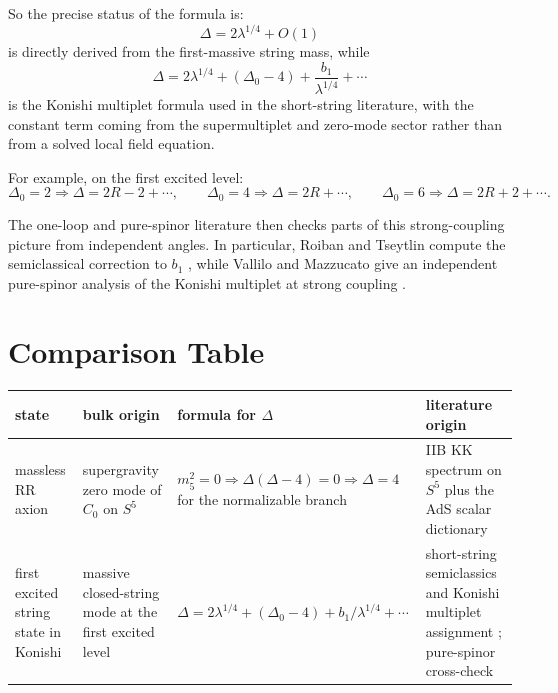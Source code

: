 \documentclass[12pt]{article}
\newcommand{\D}{\Delta}
\begin{document}
So the precise status of the formula is:
\begin{equation}
\D = 2\lambda^{1/4}+O(1)
\end{equation}
is directly derived from the first-massive string mass, while
\begin{equation}
\D = 2\lambda^{1/4}+(\D_0-4)+\frac{b_1}{\lambda^{1/4}}+\cdots
\end{equation}
is the Konishi multiplet formula used in the short-string literature, with the constant term coming from
the supermultiplet and zero-mode sector rather than from a solved local field equation.

For example, on the first excited level:
\begin{equation}
\D_0=2 \Rightarrow \D = 2R-2+\cdots,\qquad
\D_0=4 \Rightarrow \D = 2R+\cdots,\qquad
\D_0=6 \Rightarrow \D = 2R+2+\cdots .
\end{equation}

The one-loop and pure-spinor literature then checks parts of this strong-coupling picture from
independent angles.  In particular, Roiban and Tseytlin compute the semiclassical correction to $b_1$
\cite{RT2009,RT2011}, while Vallilo and Mazzucato give an independent pure-spinor analysis of the
Konishi multiplet at strong coupling \cite{ValliloMazzucato}.

\section{Comparison Table}

\begin{center}
\small
\renewcommand{\arraystretch}{1.25}
\begin{tabular}{>{\raggedright\arraybackslash}p{2.6cm} >{\raggedright\arraybackslash}p{3.7cm} >{\raggedright\arraybackslash}p{3.4cm} >{\raggedright\arraybackslash}p{4.2cm}}
\toprule
state & bulk origin & formula for $\D$ & literature origin \\
\midrule
massless RR axion &
supergravity zero mode of $C_0$ on $S^5$ &
$m_5^2=0 \Rightarrow \D(\D-4)=0 \Rightarrow \D=4$ for the normalizable branch &
IIB KK spectrum on $S^5$ plus the AdS scalar dictionary \cite{KimRomansVN,GunaydinMarcus,GKP,Witten,AharonyReview} \\
\midrule
first excited string state in Konishi &
massive closed-string mode at the first excited level &
$\D=2\lambda^{1/4}+(\D_0-4)+b_1/\lambda^{1/4}+\cdots$ &
short-string semiclassics and Konishi multiplet assignment \cite{RT2009,RT2011}; pure-spinor cross-check \cite{ValliloMazzucato} \\
\bottomrule
\end{tabular}
\end{center}
\end{document}
